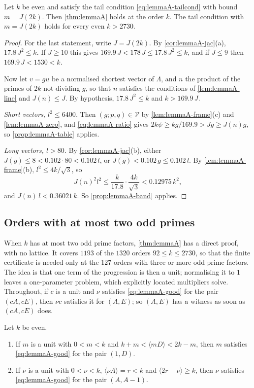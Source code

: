 \begin{proposition}
\label{prop:lemmaA-tail}
Let $k$ be even and satisfy the tail condition
\eqref{eq:lemmaA-tailcond} with bound $m=J(2k)$. Then \autoref{thm:lemmaA}
holds at the order $k$. The tail condition with $m=J(2k)$ holds for every
even $k>2730$.
\end{proposition}

\begin{proof}
For the last statement, write $J=J(2k)$. By \autoref{cor:lemmaA-jac}(a),
$17.8\,J^2\le k$. If $J\ge10$ this gives $169.9\,J<178\,J\le17.8\,J^2\le k$,
and if $J\le9$ then $169.9\,J<1530<k$.

Now let $v=gu$ be a normalised shortest vector of $\Lambda$, and $n$ the
product of the primes of $2k$ not dividing $g$, so that $n$ satisfies the
conditions of \autoref{lem:lemmaA-line} and $J(n)\le J$. By hypothesis,
$17.8\,J^2\le k$ and $k>169.9\,J$.

\emph{Short vectors, $l^2\le6400$.} Then $(g;p,q)\in\mathcal V$ by
\autoref{lem:lemmaA-frame}(c) and \autoref{lem:lemmaA-zero}, and
\eqref{eq:lemmaA-ratio} gives $2k\psi\ge kg/169.9>Jg\ge J(n)g$, so
\autoref{prop:lemmaA-table} applies.

\emph{Long vectors, $l>80$.} By \autoref{cor:lemmaA-jac}(b), either
$J(g)\le8<0.102\cdot80<0.102\,l$, or $J(g)<0.102\,g\le0.102\,l$. By
\autoref{lem:lemmaA-frame}(b), $l^2\le4k/\sqrt3$, so
\[
J(n)^2l^2\le\frac{k}{17.8}\cdot\frac{4k}{\sqrt3}<0.12975\,k^2,
\]
and $J(n)\,l<0.36021\,k$. So \autoref{prop:lemmaA-band} applies.
\end{proof}

\subsection{Orders with at most two odd primes}
\label{sec:lemmaA-twoprime}

When $k$ has at most two odd prime factors, \autoref{thm:lemmaA} has a direct
proof, with no lattice. It covers $1193$ of the $1320$ orders
$92\le k\le2730$, so that the finite certificate is needed only at the $127$
orders with three or more odd prime factors. The idea is that one term of the
progression is then a unit; normalising it to $1$ leaves a one-parameter
problem, which explicitly located multipliers solve. Throughout, if $c$ is a
unit and $\nu$ satisfies \eqref{eq:lemmaA-good} for the pair $(cA,cE)$, then
$\nu c$ satisfies it for $(A,E)$; so $(A,E)$ has a witness as soon as
$(cA,cE)$ does.

\begin{lemma}
\label{lem:lemmaA-normal}
Let $k$ be even.
\begin{enumerate}
\item[(a)] If $m$ is a unit with $0<m<k$ and $k+m<\langle mD\rangle<2k-m$,
then $m$ satisfies \eqref{eq:lemmaA-good} for the pair $(1,D)$.
\item[(b)] If $\nu$ is a unit with $0<\nu<k$, $\langle\nu A\rangle=r<k$ and
$\langle2r-\nu\rangle\ge k$, then $\nu$ satisfies \eqref{eq:lemmaA-good} for the
pair $(A,A-1)$.
\end{enumerate}
\end{lemma}

